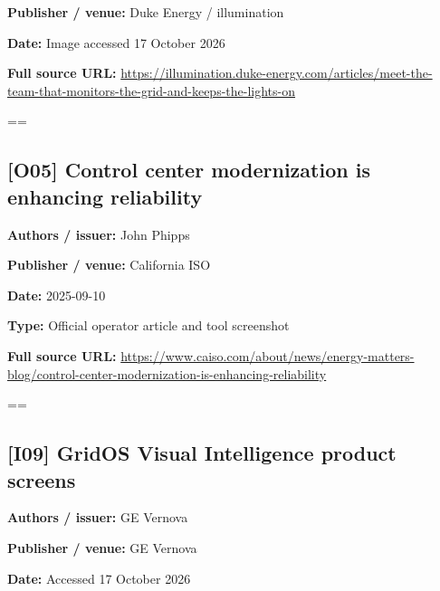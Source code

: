 \documentclass[10pt,letterpaper]{article}
\begin{document}
\textbf{Publisher / venue:} Duke Energy / illumination\par
\textbf{Date:} Image accessed 17 October 2026\par
\textbf{Full source URL:} \href{https://illumination.duke-energy.com/articles/meet-the-team-that-monitors-the-grid-and-keeps-the-lights-on}{\small\ttfamily https:/\allowbreak{}/\allowbreak{}illumination.\allowbreak{}duke-\allowbreak{}energy.\allowbreak{}com/\allowbreak{}articles/\allowbreak{}meet-\allowbreak{}the-\allowbreak{}team-\allowbreak{}that-\allowbreak{}monitors-\allowbreak{}the-\allowbreak{}grid-\allowbreak{}and-\allowbreak{}keeps-\allowbreak{}the-\allowbreak{}lights-\allowbreak{}on}\par
\egroup\par\noindent\box\readingEntry\par\medskip
\setbox\readingEntry=\vbox\bgroup\hsize=\linewidth\subsection*{[O05] Control center modernization is enhancing reliability}
\textbf{Authors / issuer:} John Phipps\par
\textbf{Publisher / venue:} California ISO\par
\textbf{Date:} 2025-09-10\par
\textbf{Type:} Official operator article and tool screenshot\par
\textbf{Full source URL:} \href{https://www.caiso.com/about/news/energy-matters-blog/control-center-modernization-is-enhancing-reliability}{\small\ttfamily https:/\allowbreak{}/\allowbreak{}www.\allowbreak{}caiso.\allowbreak{}com/\allowbreak{}about/\allowbreak{}news/\allowbreak{}energy-\allowbreak{}matters-\allowbreak{}blog/\allowbreak{}control-\allowbreak{}center-\allowbreak{}modernization-\allowbreak{}is-\allowbreak{}enhancing-\allowbreak{}reliability}\par
\egroup\par\noindent\box\readingEntry\par\medskip
\setbox\readingEntry=\vbox\bgroup\hsize=\linewidth\subsection*{[I09] GridOS Visual Intelligence product screens}
\textbf{Authors / issuer:} GE Vernova\par
\textbf{Publisher / venue:} GE Vernova\par
\textbf{Date:} Accessed 17 October 2026\par
\end{document}
